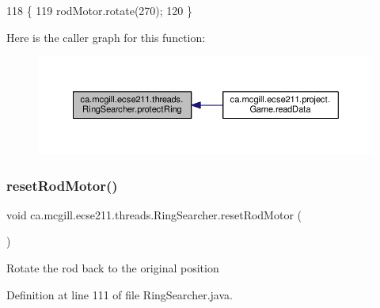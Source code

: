 \begin{DoxyCode}
118                             \{
119     rodMotor.rotate(270);
120   \}
\end{DoxyCode}
Here is the caller graph for this function\+:
\nopagebreak
\begin{figure}[H]
\begin{center}
\leavevmode
\includegraphics[width=350pt]{classca_1_1mcgill_1_1ecse211_1_1threads_1_1_ring_searcher_a17ca33f66eca9dd1ad822f99849296ec_icgraph}
\end{center}
\end{figure}
\mbox{\label{classca_1_1mcgill_1_1ecse211_1_1threads_1_1_ring_searcher_a3d6f49addfa2bd5d61903287c68aefd6}} 
\subsubsection{\texorpdfstring{reset\+Rod\+Motor()}{resetRodMotor()}}
{\footnotesize\ttfamily void ca.\+mcgill.\+ecse211.\+threads.\+Ring\+Searcher.\+reset\+Rod\+Motor (\begin{DoxyParamCaption}{ }\end{DoxyParamCaption})}

Rotate the rod back to the original position 

Definition at line 111 of file Ring\+Searcher.\+java.



